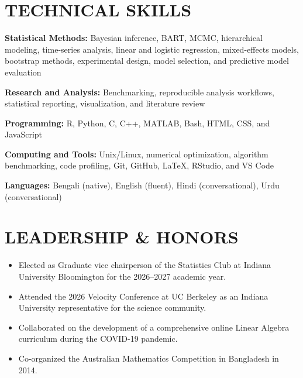 \documentclass[10pt,letterpaper]{article}
\newenvironment{resumeItems}{%
  \begin{itemize}[
    label=\textbullet,
    leftmargin=14pt,
    labelsep=5pt,
    itemsep=0.5pt,
    topsep=1.0pt,
    parsep=0pt,
    partopsep=0pt
  ]
}{%
  \end{itemize}
}
\begin{document}
\section*{TECHNICAL SKILLS}

\textbf{Statistical Methods:}
Bayesian inference, BART, MCMC, hierarchical modeling, time-series analysis, linear and logistic regression, mixed-effects models, bootstrap methods, experimental design, model selection, and predictive model evaluation

\textbf{Research and Analysis:}
Benchmarking, reproducible analysis workflows, statistical reporting, visualization, and literature review

\textbf{Programming:}
R, Python, C, C++, MATLAB, Bash, HTML, CSS, and JavaScript

\textbf{Computing and Tools:}
Unix/Linux, numerical optimization, algorithm benchmarking, code profiling, Git, GitHub, LaTeX, RStudio, and VS Code

\textbf{Languages:}
Bengali (native), English (fluent), Hindi (conversational), Urdu (conversational)

\section*{LEADERSHIP \& HONORS}

\begin{resumeItems}
    \item Elected as Graduate vice chairperson of the Statistics Club at Indiana University Bloomington for the 2026--2027 academic year.

  \item Attended the 2026 Velocity Conference at UC Berkeley as an Indiana University representative for the science community.

  \item Collaborated on the development of a comprehensive online Linear Algebra curriculum during the COVID-19 pandemic.

  \item Co-organized the Australian Mathematics Competition in Bangladesh in 2014.
\end{resumeItems}
\end{document}
